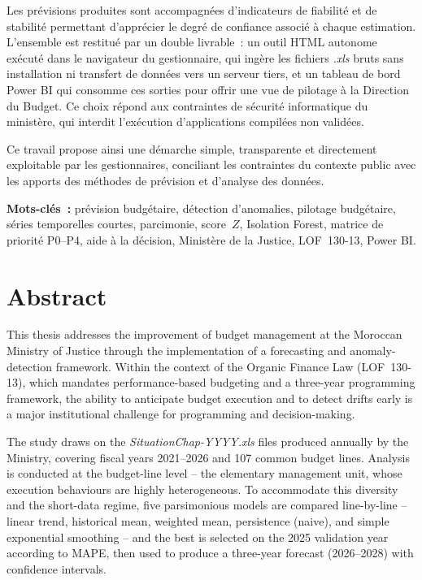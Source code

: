 \documentclass[12pt,a4paper]{article}
\begin{document}
Les pr\'evisions produites sont accompagn\'ees d'indicateurs de fiabilit\'e et de stabilit\'e permettant d'appr\'ecier le degr\'e de confiance associ\'e \`a chaque estimation. L'ensemble est restitu\'e par un double livrable~: un outil HTML autonome ex\'ecut\'e dans le navigateur du gestionnaire, qui ing\`ere les fichiers \textit{.xls} bruts sans installation ni transfert de donn\'ees vers un serveur tiers, et un tableau de bord Power BI qui consomme ces sorties pour offrir une vue de pilotage \`a la Direction du Budget. Ce choix r\'epond aux contraintes de s\'ecurit\'e informatique du minist\`ere, qui interdit l'ex\'ecution d'applications compil\'ees non valid\'ees.

Ce travail propose ainsi une d\'emarche simple, transparente et directement exploitable par les gestionnaires, conciliant les contraintes du contexte public avec les apports des m\'ethodes de pr\'evision et d'analyse des donn\'ees.

\bigskip
\noindent\textbf{Mots-cl\'es~:} pr\'evision budg\'etaire, d\'etection d'anomalies, pilotage budg\'etaire, s\'eries temporelles courtes, parcimonie, score~$Z$, Isolation Forest, matrice de priorit\'e P0--P4, aide \`a la d\'ecision, Minist\`ere de la Justice, LOF~130-13, Power BI.

\newpage

\section*{Abstract}

This thesis addresses the improvement of budget management at the Moroccan Ministry of Justice through the implementation of a forecasting and anomaly-detection framework. Within the context of the Organic Finance Law (LOF~130-13), which mandates performance-based budgeting and a three-year programming framework, the ability to anticipate budget execution and to detect drifts early is a major institutional challenge for programming and decision-making.

The study draws on the \textit{SituationChap-YYYY.xls} files produced annually by the Ministry, covering fiscal years 2021--2026 and 107 common budget lines. Analysis is conducted at the budget-line level -- the elementary management unit, whose execution behaviours are highly heterogeneous. To accommodate this diversity and the short-data regime, five parsimonious models are compared line-by-line -- linear trend, historical mean, weighted mean, persistence (naive), and simple exponential smoothing -- and the best is selected on the 2025 validation year according to MAPE, then used to produce a three-year forecast (2026--2028) with confidence intervals.
\end{document}
